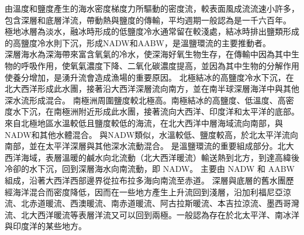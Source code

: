 \documentclass[a4paper,12pt]{report}
\begin{document}
由溫度和鹽度產生的海水密度梯度力所驅動的密度流，較表面風成流流速小許多，包含深層和底層洋流，帶動熱與鹽度的傳輸，平均週期一般認為是一千六百年。\\
極地冰層為淡水，融冰時形成的低鹽度冷水通常留在較淺處，結冰時排出鹽類形成的高鹽度冷水則下沉，形成NADW和AABW，是溫鹽環流的主要推動者。\\
深層海水為深海帶來富含氧氣的冷水，使深海好氧生物生存，在傳輸中因為其中生物的呼吸作用，使氧氣濃度下降、二氧化碳濃度提高，並因為其中生物的分解作用使養分增加，是湧升流會造成漁場的重要原因。
北極結冰的高鹽度冷水下沉，在北大西洋形成此水團，接著沿大西洋深層流向南方，並在南半球深層海洋中與其他深水流形成混合。
南極洲周圍鹽度較北極高。南極結冰的高鹽度、低溫度、高密度水下沉，在南極洲附近形成此水團，接著流向大西洋、印度洋和太平洋的底部。
來自北極地區水溫較低且鹽度較低的海流，在北大西洋中層海域流向南部，與NADW和其他水體混合。
與NADW類似，水溫較低、鹽度較高，於北太平洋流向南部，並在太平洋深層與其他深水流動混合。
是溫鹽環流的重要組成部分。北大西洋海域，表層溫暖的鹹水向北流動（北大西洋暖流）輸送熱到北方，到達高緯後冷卻的水下沉，回到深層海水向南流動，即 NADW。
主要由 NADW 和 AABW 組成，沿著大西洋西部邊界從拉布拉多海向南流至赤道。
深層與底層的舊水團歷經海洋混合而密度降低，因而在一些地方產生上升流回到淺層，沿加利福尼亞涼流、北赤道暖流、西澳暖流、南赤道暖流、阿古拉斯暖流、本吉拉涼流、墨西哥灣流、北大西洋暖流等表層洋流又可以回到兩極。一般認為存在於北太平洋、南冰洋與印度洋的某些地方。
\end{document}
